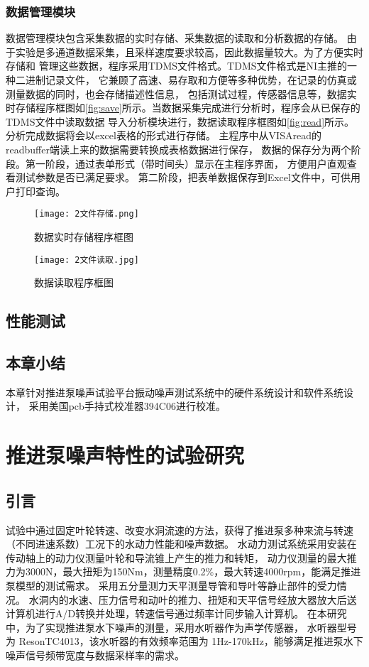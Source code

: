 \subsection{数据管理模块}
数据管理模块包含采集数据的实时存储、采集数据的读取和分析数据的存储。
由于实验是多通道数据采集，且采样速度要求较高，因此数据量较大。为了方便实时存储和
管理这些数据，程序采用TDMS文件格式。TDMS文件格式是NI主推的一种二进制记录文件，
它兼顾了高速、易存取和方便等多种优势，在记录的仿真或测量数据的同时，也会存储描述性信息，
包括测试过程，传感器信息等，数据实时存储程序框图如\autoref{fig:save}所示。当数据采集完成进行分析时，程序会从已保存的TDMS文件中读取数据
导入分析模块进行，数据读取程序框图如\autoref{fig:read}所示。分析完成数据将会以excel表格的形式进行存储。
主程序中从VISAread的readbuffer端读上来的数据需要转换成表格数据进行保存，
数据的保存分为两个阶段。第一阶段，通过表单形式（带时间头）显示在主程序界面，
方便用户直观查看测试参数是否已满足要求。
第二阶段，把表单数据保存到Excel文件中，可供用户打印查询。
\begin{figure}[htbp]
    \centering
    \texttt{[image: 2文件存储.png]}
    \caption{\label{fig:save}数据实时存储程序框图}
\end{figure}
\begin{figure}[htbp]
    \centering
    \texttt{[image: 2文件读取.jpg]}
    \caption{\label{fig:read}数据读取程序框图}
\end{figure}
\section{性能测试}
\section{本章小结}
本章针对推进泵噪声试验平台振动噪声测试系统中的硬件系统设计和软件系统设计，
采用美国pcb手持式校准器394C06进行校准。

\chapter{推进泵噪声特性的试验研究}\label{ch:chapter3}
\section{引言}


试验中通过固定叶轮转速、改变水洞流速的方法，获得了推进泵多种来流与转速（不同进速系数）工况下的水动力性能和噪声数据。
水动力测试系统采用安装在传动轴上的动力仪测量叶轮和导流锥上产生的推力和转矩，
动力仪测量的最大推力为3000N，最大扭矩为150Nm，测量精度0.2\%，最大转速4000rpm，能满足推进泵模型的测试需求。
采用五分量测力天平测量导管和导叶等静止部件的受力情况。
水洞内的水速、压力信号和动叶的推力、扭矩和天平信号经放大器放大后送计算机进行A/D转换并处理，转速信号通过频率计同步输入计算机。
在本研究中，为了实现推进泵水下噪声的测量，采用水听器作为声学传感器，
水听器型号为 ResonTC4013，该水听器的有效频率范围为 1Hz-170kHz，能够满足推进泵水下噪声信号频带宽度与数据采样率的需求。


